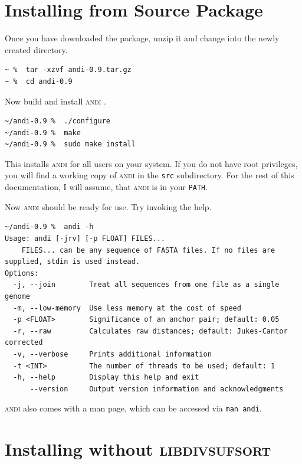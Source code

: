 \documentclass[a4paper,
  10pt,
  english,
  DIV=12,
  BCOR=8mm]{scrbook}
\newcommand{\algo}[1]{\textsc{{#1}}}
\newcommand{\andi}{\algo{andi} }
\begin{document}
\section{Installing from Source Package} \label{sub:regular}

Once you have downloaded the package, unzip it and change into the newly created directory. 

\begin{lstlisting}
~ %  tar -xzvf andi-0.9.tar.gz
~ %  cd andi-0.9
\end{lstlisting}

\noindent Now build and install \andi.

\begin{lstlisting}
~/andi-0.9 %  ./configure
~/andi-0.9 %  make
~/andi-0.9 %  sudo make install
\end{lstlisting}

\noindent This installs \andi for all users on your system. If you do not have root privileges, you will find a working copy of \andi in the \lstinline$src$ subdirectory. For the rest of this documentation, I will assume, that \andi is in your \textdollar\lstinline!PATH!.

Now \andi should be ready for use. Try invoking the help.

\begin{lstlisting}
~/andi-0.9 %  andi -h
Usage: andi [-jrv] [-p FLOAT] FILES...
	FILES... can be any sequence of FASTA files. If no files are supplied, stdin is used instead.
Options:
  -j, --join        Treat all sequences from one file as a single genome
  -m, --low-memory  Use less memory at the cost of speed
  -p <FLOAT>        Significance of an anchor pair; default: 0.05
  -r, --raw         Calculates raw distances; default: Jukes-Cantor corrected
  -v, --verbose     Prints additional information
  -t <INT>          The number of threads to be used; default: 1
  -h, --help        Display this help and exit
      --version     Output version information and acknowledgments
\end{lstlisting}

\noindent \andi also comes with a man page, which can be accessed via \lstinline$man andi$. %

\section{Installing without \algo{libdivsufsort}} \label{sub:wo-divsufsort}
\end{document}
